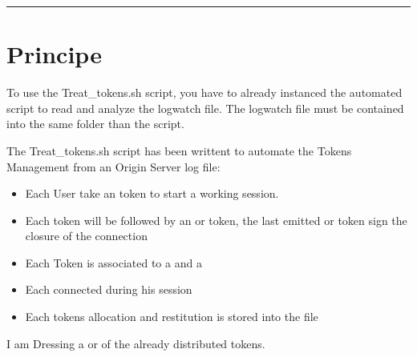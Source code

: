 \documentclass[letterpaper,10pt,english]{sphinxmanual}
\begin{document}
\bigskip\hrule\bigskip


\newpage
\section{Principe}
\label{\detokenize{Treat_tokens:principe}}
\sphinxAtStartPar
To use the Treat\_tokens.sh script, you have to already instanced the  automated script to read and analyze the logwatch file.
The logwatch file must be contained into the same folder than the script.

\sphinxAtStartPar
The Treat\_tokens.sh script has been writtent to automate the Tokens Management from an Origin Server log file:
\begin{itemize}
\item {} 
\sphinxAtStartPar
Each User take an  token to start a working session.

\item {} 
\sphinxAtStartPar
Each  token will be followed by an  or  token, the last emitted  or  token sign the closure of the connection

\item {} 
\sphinxAtStartPar
Each Token is associated to a  and a 

\item {} 
\sphinxAtStartPar
Each connected  during his session

\item {} 
\sphinxAtStartPar
Each tokens allocation and restitution is stored into the  file

\end{itemize}

\sphinxAtStartPar
I am Dressing a  or  of the already distributed tokens.
\end{document}
